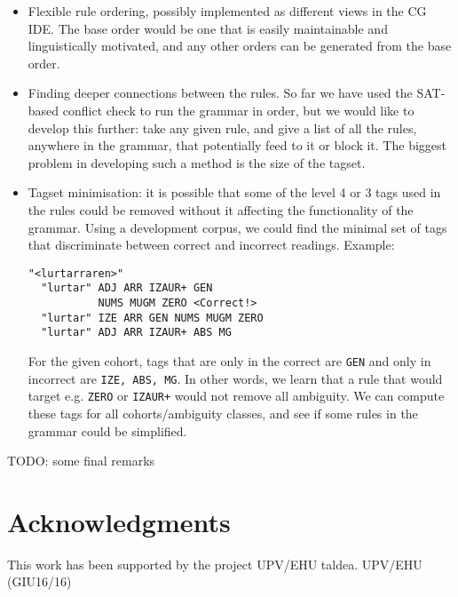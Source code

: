 \documentclass[11pt]{article}
\def\t#1{\texttt{#1}}
\begin{document}
\begin{itemize}
\item Flexible rule ordering, possibly implemented as different views
  in the CG IDE. The base order would be one that is easily
  maintainable and linguistically motivated, and any other orders can
  be generated from the base order.
\item Finding deeper connections between the rules. So far we have used the
  SAT-based conflict check to run the grammar in order, but we would
  like to develop this further: take any given rule, and give a list
  of all the rules, anywhere in the grammar, that potentially feed to
  it or block it. The biggest problem in developing such a method is
  the size of the tagset. 
\item Tagset minimisation: it is possible that some of the level 4 or
  3 tags used in the rules could be removed without it affecting the
  functionality of the grammar. Using a development corpus, we could
  find the minimal set of tags that discriminate between correct and
  incorrect readings.
Example:

\begin{verbatim}
"<lurtarraren>"
  "lurtar" ADJ ARR IZAUR+ GEN 
           NUMS MUGM ZERO <Correct!>
  "lurtar" IZE ARR GEN NUMS MUGM ZERO 
  "lurtar" ADJ ARR IZAUR+ ABS MG
\end{verbatim}

For the given cohort, tags that are only in the correct are \t{GEN} and only in incorrect are \t{IZE, ABS, MG}.
In other words, we learn that a rule that would target e.g. \t{ZERO} or \t{IZAUR+} would not remove all ambiguity.
We can compute these tags for all cohorts/ambiguity classes, and see if some rules in the grammar could be simplified.
\end{itemize}

TODO: some final remarks

\section*{Acknowledgments}

This work has been supported by the project UPV/EHU taldea. UPV/EHU (GIU16/16)










\end{document}
